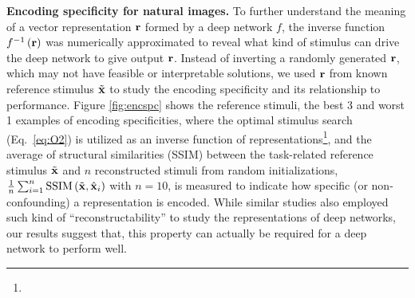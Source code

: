 \documentclass[10pt,twocolumn,letterpaper]{article}
\begin{document}
{\bf Encoding specificity for natural images.} To further understand the meaning of a vector representation $\bf{r}$ formed by a deep network $f$, the inverse function $f^{-1}\left( \bf{r} \right)$ {was} numerically approximated to reveal what kind of stimulus can drive the deep network to give output $\bf{r}$. 
Instead of inverting a randomly generated $\bf{r}$, which may not have feasible or interpretable solutions, we {used} $\bf{r}$ from known reference stimulus $\tilde{\bf{x}}$ to study the encoding specificity and its relationship to performance.
Figure \ref{fig:encspc} shows the reference stimuli, the best 3 and worst 1 examples of encoding specificities, where the optimal stimulus search (Eq.~\ref{eq:O2}) is utilized as an inverse function of representations\footnote{\expregular}, and the average of structural similarities (SSIM) \cite{wang2004image} between the task-related reference stimulus $\tilde{\bf{x}}$ and $n$ reconstructed stimuli from random initializations, \ie $\frac{1}{n}\sum_{i=1}^{n} \mathrm{SSIM}\left(\tilde{\bf{x}} , \hat{{\bf{x}}}_i \right)$ with $n=10$, is measured to indicate how specific (or non-confounding) a representation is encoded.
While similar studies \cite{mahendran2014understanding, long2014convnets, razavian2014persistent} also employed such kind of ``reconstructability'' to study the representations of deep networks, our results suggest that, this property can actually be required for a deep network to perform well.


\end{document}
